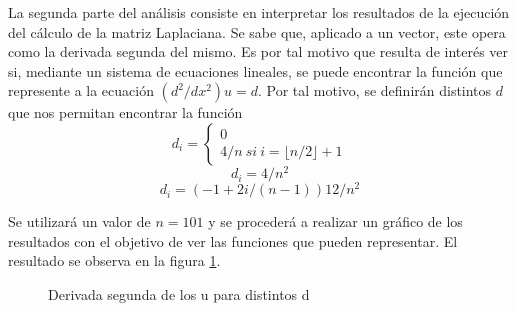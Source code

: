 La segunda parte del análisis consiste en interpretar los resultados de la ejecución del cálculo de la matriz Laplaciana. Se sabe que, aplicado a un vector, este opera como la derivada segunda del mismo.
Es por tal motivo que resulta de interés ver si, mediante un sistema de ecuaciones lineales, se puede encontrar la función que represente a la ecuación $ (d^{2}/dx^{2})u = d $.
Por tal motivo, se definirán distintos $d$ que nos permitan encontrar la función
$$  d_{i} = \begin{cases}
      0 \\
      4/n \ \textit{si} \ i =  \lfloor n/2 \rfloor + 1
   \end{cases}
$$
$$ d_{i} = 4/n^{2} $$
$$ d_{i} = (-1 + 2i/(n - 1))12/n^{2}$$

Se utilizará un valor de $n = 101$ y se procederá a realizar un gráfico de los resultados con el objetivo de ver las funciones que pueden representar.
El resultado se observa en la figura \ref{fig:difusion}.

\begin{figure}[H]
   \centering
   
   \caption{Derivada segunda de los u para distintos d}
   \label{fig:difusion}
\end{figure}
